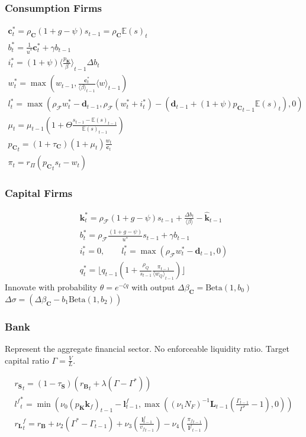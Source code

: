 \documentclass[]{beamer}
\begin{document}
\begin{frame}
	\frametitle{Consumption Firms}
	\vspace{-1em}
	\begin{gather*}
		\mathbf{c}^*_t = \rho_\mathbf{C}(1+g-\psi)s_{t-1} = \rho_\mathbf{C}{\mathbb{E}(s)}_t \\
		b^*_t = \frac{1}{u^*}\mathbf{c}^*_t + \gamma b_{t-1} \\
		i^*_t = (1+\psi){\langle\frac{{p_\mathbf{K}}}{\beta}\rangle}_{t-1}{\Delta b}_t \\
		w_t^* = \max(w_{t-1}, \frac{\mathbf{c}^*_t}{{\langle \beta \rangle}_{t-1}}{\langle w \rangle}_{t-1}) \\
		l_t^* = \max(\rho_\mathcal{F} w_t^* - \mathbf{d}_{t-1}, \rho_\mathcal{F} (w_t^* + i_t^*) - (\mathbf{d}_{t-1} + (1+\psi){p_\mathbf{C}}_{t-1} {\mathbb{E}(s)}_t), 0) \\
		\mu_t = \mu_{t-1}(1 + \Theta \frac{s_{t-1}-{\mathbb{E}(s)}_{t-1}}{{\mathbb{E}(s)}_{t-1}}) \\
		{p_\mathbf{C}}_t = (1+\tau_\mathbf{C})(1+\mu_t)\frac{w_t}{\mathbf{c}_t} \\
		\pi_t = r_\Pi ({p_\mathbf{C}}_t s_t - w_t)
	\end{gather*}
\end{frame}

\begin{frame}
	\frametitle{Capital Firms}
	\begin{gather*}
		\mathbf{k}_t^* = \rho_\mathcal{F}(1+g-\psi)s_{t-1} + \frac{{\Delta b}_t}{\langle \beta \rangle} - \hat{\mathbf{k}}_{t-1} \\
		b^*_t = \rho_\mathcal{F}\frac{(1+g-\psi)}{u^*}s_{t-1} + \gamma b_{t-1} \\
		i^*_t = 0, \qquad l_t^* = \max(\rho_\mathcal{F} w_t^* - \mathbf{d}_{t-1}, 0) \\
		q_t^* = \lfloor q_{t-1} (1+\frac{\rho_Q}{s_{t-1}}\frac{\pi_{t-1}}{{\langle w_Q \rangle}_{t-1}}) \rfloor
	\end{gather*}
	Innovate with probability $\theta = e^{-\zeta q}$ with output $\Delta \beta_\mathbf{C} = \text{Beta}(1, b_0)$ $\Delta \sigma = (\Delta \beta_\mathbf{C} - b_1 \text{Beta}(1, b_2))$

\end{frame}

\begin{frame}
	\frametitle{Bank}
	Represent the aggregate financial sector. No enforceable liquidity ratio. Target capital ratio $\Gamma = \frac{V}{L}$.

	\begin{gather*}
		{r_\mathbf{S}}_t = (1 - \tau_\mathbf{S}) ({r_\mathbf{B}}_t + \lambda(\Gamma - \Gamma^*))\\
		{l^f}^*_t = \min (\nu_0 (p_\mathbf{K}{\mathbf{k}_f})_{t-1} - \mathbf{l}^f_{t-1}, \max((\nu_1 N_F)^{-1} \mathbf{L}_{t-1} (\frac{\Gamma_{t-1}}{\Gamma^*}-1),0)) \\
		{r_\mathbf{L}}^f_t = r_\mathbf{B} + \nu_2 (\Gamma^* - \Gamma_{t-1}) + \nu_3 (\frac{\mathbf{l}^f_{t-1}}{{v_f}_{t-1}}) - \nu_4 (\frac{{\pi_f}_{t-1}}{{\mathbf{l}^f}_{t-1}})
	\end{gather*}
\end{frame}
\end{document}
